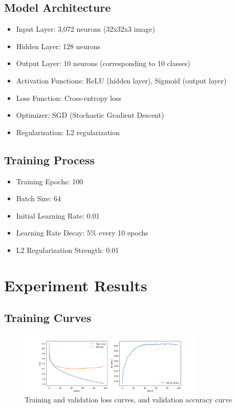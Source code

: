 \documentclass[12pt]{article}
\begin{document}
\subsection{Model Architecture}
\begin{itemize}
    \item Input Layer: 3,072 neurons (32x32x3 image)
    \item Hidden Layer: 128 neurons
    \item Output Layer: 10 neurons (corresponding to 10 classes)
    \item Activation Functions: ReLU (hidden layer), Sigmoid (output layer)
    \item Loss Function: Cross-entropy loss
    \item Optimizer: SGD (Stochastic Gradient Descent)
    \item Regularization: L2 regularization
\end{itemize}

\subsection{Training Process}
\begin{itemize}
    \item Training Epochs: 100
    \item Batch Size: 64
    \item Initial Learning Rate: 0.01
    \item Learning Rate Decay: 5\% every 10 epochs
    \item L2 Regularization Strength: 0.01
\end{itemize}

\section{Experiment Results}

\subsection{Training Curves}
\begin{figure}[H]
    \centering
    \includegraphics[width=0.8\textwidth]{results/training_curves.png}
    \caption{Training and validation loss curves, and validation accuracy curve}
    \label{fig:training_curves}
\end{figure}
\end{document}

